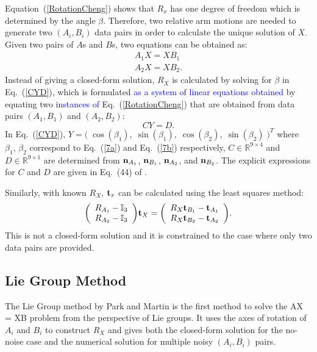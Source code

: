 \documentclass[twocolumn,10pt]{asme2ej}
\newcommand{\nn}{{\bf n}}
\newcommand{\ttt}{{\bf t}}
\begin{document}
Equation~(\ref{RotationCheng}) shows that $R_{x}$ has one degree of freedom which is determined by the angle $\beta$. Therefore, two relative arm motions are needed to generate two $(A_{i}, B_{i})$ data pairs in order to calculate the unique solution of $X$. Given two pairs of $A$s and $B$s, two equations can be obtained as:
\begin{subequations}
\begin{gather}
A_{1}X = XB_{1} \label{7a}\\
A_{2}X = XB_{2}.\label{7b}
\end{gather}
\end{subequations}
Instead of giving a closed-form solution, $R_{X}$ is calculated by solving for $\beta$ in Eq.~(\ref{CYD}), which is formulated \textcolor{blue}{as a system of linear equations obtained} by equating two \textcolor{blue}{instances of} Eq.~(\ref{RotationCheng}) that are obtained from data pairs $(A_{1}, B_{1})$ and $(A_{2}, B_{2})$:
\begin{equation}
CY = D.
\label{CYD}
\end{equation}
In Eq.~(\ref{CYD}), $Y = \big( \; \cos(\beta_{1}),\; \sin(\beta_{1}), \; \cos(\beta_{2}),\; 	\sin(\beta_{2}) \;\big)^{T}$ where $\beta_{1}, \, \beta_{2}$ correspond to Eq.~(\ref{7a}) and Eq.~(\ref{7b}) respectively,  $C \in \mathbb{R}^{9 \times 4}$ and $D \in \mathbb{R}^{9 \times 1}$ are determined from $\nn_{A_{1}}$, $\nn_{B_{1}}$, $\nn_{A_{2}}$, and $\nn_{B_{2}}$. The explicit expressions for $C$ and $D$ are given in Eq.~(44) of \cite{shiu1989calibration}.

Similarly, with known $R_{X}$, $\ttt_{x}$ can be calculated using the least squares method:
\begin{equation}
\bigg(\begin{array}{lr}
R_{A_{1}} - \mathbb{I}_{3} \\
R_{A_{2}} - \mathbb{I}_{3}
\end{array}\bigg)\ttt_{X}=
\bigg(\begin{array}{lr}
R_{X}\ttt_{B_{1}} - \ttt_{A_{1}}\\
R_{X}\ttt_{B_{2}} - \ttt_{A_{2}}
\end{array}
\bigg).
\label{trans}
\end{equation}
This is not a closed-form solution and it is constrained to the case where only two data pairs are provided. 

\subsection{Lie Group Method }
The Lie Group method \cite{park1994robot} by Park and Martin is the first method to solve the AX = XB problem from the perspective of Lie groups. It uses the axes of rotation of $A_{i}$ and $B_{i}$ to construct $R_{X}$ and gives both the closed-form solution for the no-noise case and the numerical solution for multiple noisy $(A_{i}, B_{i})$ pairs.
\end{document}
